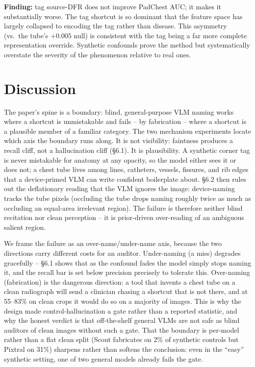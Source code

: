\documentclass{ieeeaccess}
\begin{document}
\textbf{Finding:} tag source-DFR does not improve PadChest AUC; it makes it
substantially worse. The tag shortcut is so dominant that the feature space
has largely collapsed to encoding the tag rather than disease. This
asymmetry (vs.\ the tube's $+0.005$ null) is consistent with the tag being a
far more complete representation override. Synthetic confounds prove the
method but systematically overstate the severity of the phenomenon relative
to real ones.

\section{Discussion}
\label{sec:discussion}
The paper's spine is a boundary: blind, general-purpose VLM naming works
where a shortcut is unmistakable and fails -- by fabrication -- where a
shortcut is a plausible member of a familiar category. The two mechanism
experiments locate which axis the boundary runs along. It is not
visibility: faintness produces a recall cliff, not a hallucination cliff
(\S6.1). It is plausibility. A synthetic corner tag is never mistakable for
anatomy at any opacity, so the model either sees it or does not; a chest
tube lives among lines, catheters, vessels, fissures, and rib edges that a
device-primed VLM can write confident boilerplate about. \S6.2 then rules
out the deflationary reading that the VLM ignores the image: device-naming
tracks the tube pixels (occluding the tube drops naming roughly twice as
much as occluding an equal-area irrelevant region). The failure is therefore
neither blind recitation nor clean perception -- it is prior-driven
over-reading of an ambiguous salient region.

We frame the failure as an over-name/under-name axis, because the two
directions carry different costs for an auditor. Under-naming (a miss)
degrades gracefully -- \S6.1 shows that as the confound fades the model
simply stops naming it, and the recall bar is set below precision precisely
to tolerate this. Over-naming (fabrication) is the dangerous direction: a
tool that invents a chest tube on a clean radiograph will send a clinician
chasing a shortcut that is not there, and at 55--83\% on clean crops it would
do so on a majority of images. This is why the design made
control-hallucination a gate rather than a reported statistic, and why the
honest verdict is that off-the-shelf general VLMs are not safe as blind
auditors of clean images without such a gate. That the boundary is
per-model rather than a flat clean split (Scout fabricates on 2\% of
synthetic controls but Pixtral on 31\%) sharpens rather than softens the
conclusion: even in the ``easy'' synthetic setting, one of two general
models already fails the gate.
\end{document}
